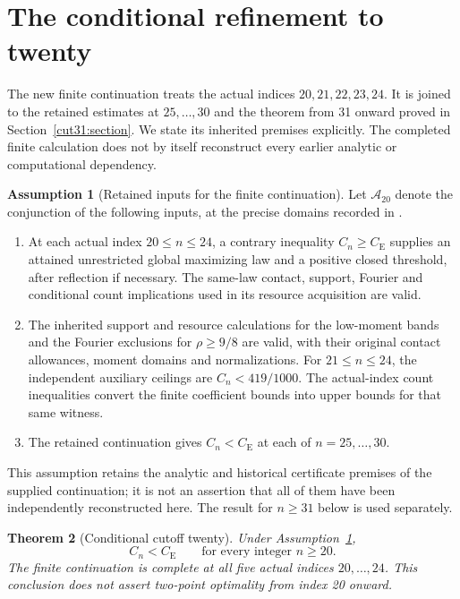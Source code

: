 \documentclass[11pt,a4paper]{article}
\numberwithin{equation}{section}
\newtheorem{theorem}{Theorem}[section]
\theoremstyle{definition}
\newtheorem{assumption}[theorem]{Assumption}
\theoremstyle{remark}
\newcommand{\CE}{C_{\mathrm E}}
\begin{document}
\section{The conditional refinement to twenty}\label{cut20:section}
The new finite continuation \cite{Cutoff20Continuation} treats the actual
indices \(20,21,22,23,24\). It is joined to the retained estimates at
\(25,\ldots,30\) and the theorem from 31 onward proved in
Section~\ref{cut31:section}. We state its inherited premises explicitly.
The completed finite calculation does not by itself reconstruct every
earlier analytic or computational dependency.

\begin{assumption}[Retained inputs for the finite continuation]
\label{cut20:retained-inputs}
Let \(\mathcal A_{20}\) denote the conjunction of the following inputs,
at the precise domains recorded in \cite{Cutoff20Continuation}.
\begin{enumerate}[leftmargin=*,label=(\roman*)]
\item At each actual index \(20\le n\le24\), a contrary inequality
\(C_n\ge\CE\) supplies an attained unrestricted global maximizing law
and a positive closed threshold, after reflection if necessary. The
same-law contact, support, Fourier and conditional count implications
used in its resource acquisition are valid.
\item The inherited support and resource calculations for the low-moment
bands and the Fourier exclusions for \(\rho\ge9/8\) are valid, with
their original contact allowances, moment domains and normalizations.
For \(21\le n\le24\), the independent auxiliary ceilings are
\(C_n<419/1000\). The actual-index count inequalities convert the
finite coefficient bounds into upper bounds for that same witness.
\item The retained continuation gives \(C_n<\CE\) at each of
\(n=25,\ldots,30\).
\end{enumerate}
This assumption retains the analytic and historical certificate
premises of the supplied continuation; it is not an assertion that
all of them have been independently reconstructed here. The result
for \(n\ge31\) below is used separately.
\end{assumption}

\begin{theorem}[Conditional cutoff twenty]\label{cut20:global:main}
Under Assumption~\ref{cut20:retained-inputs},
\[
 C_n<\CE\qquad\text{for every integer }n\ge20.
\]
The finite continuation is complete at all five actual indices
\(20,\ldots,24\). This conclusion does not assert two-point optimality
from index 20 onward.
\end{theorem}
\end{document}
